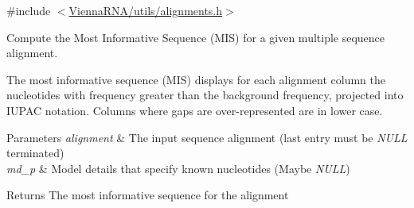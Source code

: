 {\ttfamily \#include $<$\hyperlink{utils_2alignments_8h}{Vienna\+R\+N\+A/utils/alignments.\+h}$>$}



Compute the Most Informative Sequence (M\+IS) for a given multiple sequence alignment. 

The most informative sequence (M\+IS) \cite{freyhult:2005} displays for each alignment column the nucleotides with frequency greater than the background frequency, projected into I\+U\+P\+AC notation. Columns where gaps are over-\/represented are in lower case.


\begin{DoxyParams}{Parameters}
{\em alignment} & The input sequence alignment (last entry must be {\itshape N\+U\+LL} terminated) \\
\hline
{\em md\+\_\+p} & Model details that specify known nucleotides (Maybe {\itshape N\+U\+LL}) \\
\hline
\end{DoxyParams}
\begin{DoxyReturn}{Returns}
The most informative sequence for the alignment 
\end{DoxyReturn}
